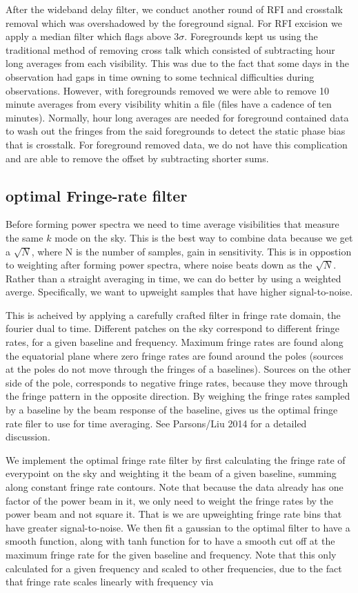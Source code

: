 \documentclass[twocolumn,numberedappendix]{emulateapj}
\begin{document}
After the wideband delay filter, we conduct another round of RFI and crosstalk
removal which was overshadowed by the foreground signal. For RFI excision we
apply a median filter which flags above $3\sigma$. Foregrounds kept us using the
traditional method of removing cross talk which consisted of subtracting hour
long averages from each visibility. This was due to the fact that some days in
the observation had gaps in time owning to some technical difficulties during
observations. However, with foregrounds removed we were able to remove 10 minute
averages from every visibility whitin a file (files have a cadence of ten
minutes). Normally, hour long averages are needed for foreground contained data
to wash out the fringes from the said foregrounds to detect the static phase
bias that is crosstalk. For foreground removed data, we do not have this
complication and are able to remove the offset by subtracting shorter sums.




\subsection{optimal Fringe-rate filter}
Before forming power spectra we need to time average visibilities that measure
the same $k$ mode on the sky. This is the best way to combine data because we
get a $\sqrt{N}$, where N is the number of samples, gain in sensitivity. This is
in oppostion to weighting after forming power spectra, where noise beats down as
the $\sqrt{N}$. Rather than a straight averaging in time, we can do better by
using a weighted averge. Specifically, we want to upweight samples that have
higher signal-to-noise. 

This is acheived by applying a carefully crafted filter in fringe rate domain,
the fourier dual to time. Different patches on the sky correspond to different
fringe rates, for a given baseline and frequency. Maximum fringe rates are found
along the equatorial plane where zero fringe rates are found around the poles
(sources at the poles do not move through the fringes of a baselines). Sources
on the other side of the pole, corresponds to negative fringe rates, because
they move through the fringe pattern in the opposite direction. By weighing the
fringe rates sampled by a baseline by the beam response of the baseline, gives
us the optimal fringe rate filer to use for time averaging. See Parsons/Liu 2014
for a detailed discussion.

We implement the optimal fringe rate filter by first calculating the fringe rate
of everypoint on the sky and weighting it the beam of a given baseline, summing
along constant fringe rate contours. Note that because the data already has one
factor of the power beam in it, we only need to weight the fringe rates by the
power beam and not square it. That is we are upweighting fringe rate bins that
have greater signal-to-noise.  We then fit a gaussian to the optimal filter to
have a smooth function, along with tanh function for to have a smooth cut off
at the maximum fringe rate for the given baseline and frequency.  Note that
this only calculated for a given frequency and scaled to other frequencies, due
to the fact that fringe rate scales linearly with frequency via
\end{document}
